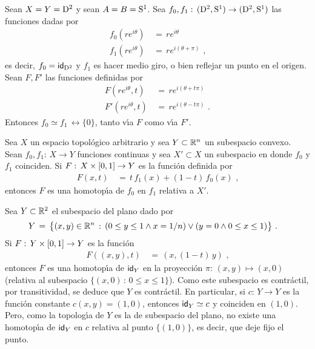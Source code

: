 \begin{ejemploReflexionEnElDisco}\label{ejemplo:reflexioneneldisco}
	Sean $X=Y=\disco{2}$ y sean $A=B=\esfera{1}$. Sea
	\begin{math}
		f_{0},f_{1}:\,(\disco{2},\esfera{1})\rightarrow
			(\disco{2},\esfera{1})
	\end{math}
	las funciones dadas por
	\begin{align*}
		f_{0}(re^{i\theta}) & \,=\,re^{i\theta} \\
		f_{1}(re^{i\theta}) & \,=\,re^{i(\theta+\pi)}
		\text{ ,}
	\end{align*}
	es decir, $f_{0}=\id[\disco{2}]$ y $f_{1}$ es hacer medio giro, o bien
	reflejar un punto en el origen. Sean $F,F'$ las funciones definidas por
	\begin{align*}
		F(re^{i\theta},t) & \,=\,re^{i(\theta+t\pi)} \\
		F'(re^{i\theta},t) & \,=\,re^{i(\theta-t\pi)}
		\text{ .}
	\end{align*}
	Entonces $f_{0}\simeq f_{1}\,\rel{\{0\}}$, tanto v\'{\i}a $F$ como
	v\'{\i}a $F'$.
\end{ejemploReflexionEnElDisco}

\begin{ejemploHomotopiaLinealEnUnConvexo}\label{ejemplo:contraccionenunconvexo}
	Sea $X$ un espacio topol\'{o}gico arbitrario y sea $Y\subset\bb{R}^{n}$
	un subespacio convexo. Sean $f_{0},f_{1}:\,X\rightarrow Y$ funciones
	continuas y sea $X'\subset X$ un subespacio en donde $f_{0}$ y $f_{1}$
	coinciden. Si $F:\,X\times\intervalo\rightarrow Y$ es la funci\'{o}n
	definida por
	\begin{align*}
		F(x,t) & \,=\,t\,f_{1}(x) + (1-t)\,f_{0}(x)
		\text{ ,}
	\end{align*}
	entonces $F$ es una homotop\'{\i}a de $f_{0}$ en $f_{1}$ relativa a
	$X'$.
\end{ejemploHomotopiaLinealEnUnConvexo}

\begin{ejemploElPeine}\label{ejemplo:elpeine}
	Sea $Y\subset\bb{R}^{2}$ el subespacio del plano dado por
	\begin{align*}
		Y & \,=\,\big\{(x,y)\in\bb{R}^{n}\,:\,
			(0\leq y\leq 1 \wedge x=1/n)\vee
			(y=0\wedge 0\leq x\leq 1)\big\}
		\text{ .}
	\end{align*}
	Si $F:\,Y\times\intervalo\rightarrow Y$ es la funci\'{o}n
	\begin{align*}
		F((x,y),t) & \,=\,(x,(1-t)\,y)
		\text{ ,}
	\end{align*}
	entonces $F$ es una homotop\'{\i}a de $\id[Y]$ en la proyecci\'{o}n
	$\pi:\,(x,y)\mapsto (x,0)$ (relativa al subespacio
	$\{(x,0)\,:\,0\leq x\leq 1\}$). Como este subespacio es contr\'{a}ctil,
	por transitividad, se deduce que $Y$ es contr\'{a}ctil. En particular,
	si $c:\,Y\rightarrow Y$ es la funci\'{o}n constante
	$c(x,y)=(1,0)$, entonces $\id[Y]\simeq c$ y coinciden en $(1,0)$.
	Pero, como la topolog\'{\i}a de $Y$ es la de subespacio del plano,
	no existe una homotop\'{\i}a de $\id[Y]$ en $c$ relativa al
	punto $\{(1,0)\}$, es decir, que deje fijo el punto.
\end{ejemploElPeine}

